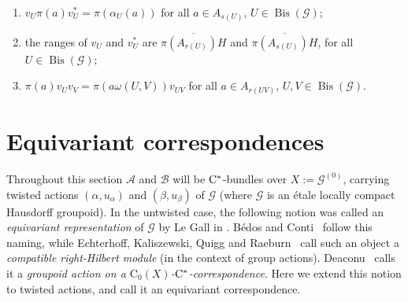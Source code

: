 \documentclass[11 pt, leqno]{amsart}
\numberwithin{equation}{section}
\theoremstyle{plain}
\newtheorem {lem} [thm]{Lemma}
\theoremstyle{definition}
\newcommand*{\contz}{\mathrm{C_0}}%
\DeclareMathOperator{\Bis}{Bis}
\renewcommand{\H}{\mathcal H}
\newcommand{\B}{\mathcal B}
\newcommand{\LL}{\mathcal L}
\newcommand{\G}{\mathcal G} %
\newcommand{\EE}{\mathcal E}
\newcommand{\A}{\mathcal A}
\newcommand{\cst}{\ifmmode\mathrm{C}^*\else{$\mathrm{C}^*$}\fi}
\begin{document}
\begin{enumerate}[labelindent=40pt,label={(CR\arabic*)},itemindent=1em] 
    \item\label{item:covariant_representation1'} $v_U \pi(a) v_{U}^* = \pi(\alpha_U(a))$ for all $a\in A_{s(U)} $, $U\in \Bis(\G)$;
    \item \label{item:covariant_representation2'} the ranges of $v_U$ and $v_U^*$ are  $\overline{\pi(A_{r(U)})H}$ and $\overline{\pi(A_{s(U)})H}$, for all $U\in \Bis(\G)$;
    \item\label{item:covariant_representation3'} $\pi(a)v_U v_V = \pi(a\omega(U,V)) v_{UV}$ for all $a\in A_{r(UV)}$, $U,V\in \Bis(\G)$. 
\end{enumerate}





%
%
\section{Equivariant correspondences} 
\label{Sec:equivariant}

Throughout this section $\A$ and $\B$ will be $\cst$-bundles over $X:=\G^{(0)}$, carrying twisted actions $(\alpha,u_\alpha)$ and $(\beta,u_\beta)$ of $\G$ 
(where $\G$ is an \'{e}tale locally compact Hausdorff groupoid). 
In the untwisted case, the following notion was called an \emph{equivariant representation} of $\G$ by Le Gall in \cite[Definition 4.6]{LeGall}. 
B\'{e}dos and Conti~\cite{BedosConti, BedosConti2} follow this naming, while 
Echterhoff, Kaliszewski, Quigg and Raeburn~\cite[Definition 2.5]{EKQR} call such an object a \emph{compatible right-Hilbert module} (in the context of group actions).  
Deaconu~\cite[Definition 5.10]{Deaconu} calls it a \emph{groupoid action on a $\contz(X)$-$\cst$-correspondence}. 
Here we extend this notion to twisted actions, and call it an equivariant correspondence.
	
\end{document}

